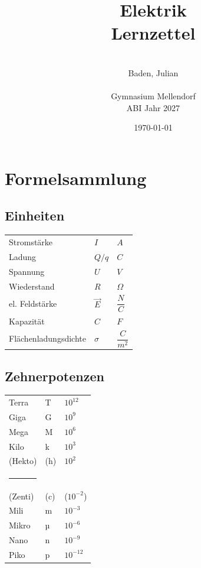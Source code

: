 \documentclass[a4paper]{article}
\title{\Huge{Elektrik\\Lernzettel}}
\date{\today}
\author{\quad\\Baden, Julian\\\quad\\Gymnasium Mellendorf\\ABI Jahr 2027}
\begin{document}
\maketitle
\thispagestyle{empty}
\newpage
\tableofcontents \thispagestyle{empty}
\newpage
{}


\section{Formelsammlung}
\subsection{Einheiten}

\begin{center}
    \begin{tabular}{ p{4cm} p{4cm} p{4cm} }
         Stromstärke            & $I$           & $A$                 \\[0,5cm]
         Ladung                 & $Q / q$  		& $C$ 			      \\[0,5cm]
         Spannung               & $U$           & $V$                 \\[0,5cm]
         Wiederstand            & $R$           & $\Omega$            \\[0,5cm]
         el. Feldstärke         & $\vec{E}$     & $\dfrac{N}{C}$      \\[0,5cm]
         Kapazität              & $C$           & $F$                 \\[0,5cm]
         Flächenladungsdichte   & $\sigma$      & $\dfrac{C}{m^2}$    \\[1cm]
    \end{tabular}
\end{center}


\subsection{Zehnerpotenzen}
\begin{center}
    \begin{tabular}{ p{4cm} p{4cm} p{4cm} }
		Terra & T & $10^{12}$ \\[0,5cm]
		Giga & G & $10^9$ \\[0,5cm]
		Mega & M & $10^6$ \\[0,5cm]
		Kilo & k & $10^3$ \\[0,5cm]
		(Hekto) & (h) & $10^2$ \\ [0,2cm]
			\rule{10cm}{0.4pt} \\[0,3cm]
		(Zenti) & (c) & ($10^{-2}$) \\[0,5cm]
		Mili & m & $10^{-3}$ \\[0,5cm]
		Mikro & µ & $10^{-6}$ \\[0,5cm]
		Nano & n & $10^{-9}$ \\[0,5cm]
		Piko & p & $10^{-12}$ \\[1cm]
    \end{tabular}
\end{center}
\end{document}
